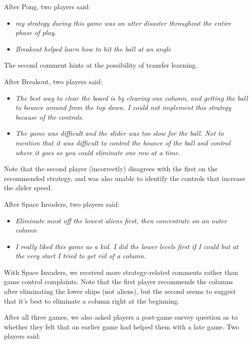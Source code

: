 \documentclass[letterpaper, 10 pt, conference]{ieeeconf}  %
\begin{document}
After Pong, two players said:

\begin{itemize}
    \item \emph{my strategy during this game was an utter disaster throughout the entire
    phase of play.}
    \item \emph{Breakout helped learn how to hit the ball at an angle}
\end{itemize}

The second comment hints at the possibility of transfer learning.

After Breakout, two players said:

\begin{itemize}
    \item \emph{The best way to clear the board is by clearing one column, and getting the ball to bounce
   around from the top down.  I could not implement this strategy because of the controls.} 
    \item \emph{The game was difficult and the slider was too slow for the ball. Not to mention that
    it was difficult to control the bounce of the ball and control where it goes so you could
    eliminate one row at a time.}
\end{itemize}

Note that the second player (incorrectly) disagrees with the first on the recommended strategy, and
was also unable to identify the controls that increase the slider speed.

After Space Invaders, two players said:

\begin{itemize}
    \item \emph{Eliminate most off the lowest aliens first, then concentrate on an outer column}
    \item \emph{I really liked this game as a kid. I did the lower levels first if I could but at
    the very start I tried to get rid of a column.}
\end{itemize}

With Space Invaders, we received more strategy-related comments rather than game control complaints.
Note that the first player recommends the columns after eliminating the lower ships (not aliens),
but the second seems to suggest that it's best to eliminate a column right at the beginning.

After all three games, we also asked players a post-game survey question as to whether they felt
that an earlier game had helped them with a late game. Two players said:
\end{document}

